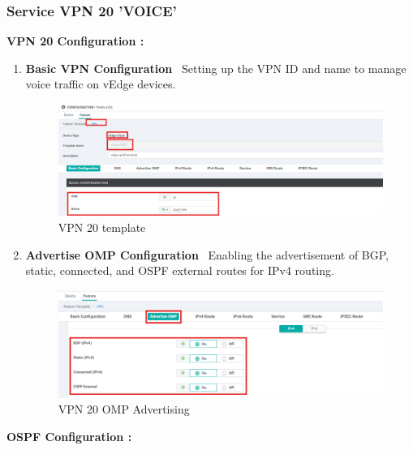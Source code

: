 \documentclass[12pt,english]{report}
\begin{document}
\subsubsection{Service VPN 20 'VOICE'}
\textbf{VPN 20 Configuration :}
\begin{enumerate}
    \item \textbf{Basic VPN Configuration} \
    Setting up the VPN ID and name to manage voice traffic on vEdge devices.
\begin{figure}[H]
    \centering
    \includegraphics[width= 0.9 \textwidth]{chapitre 3/template/13.png}
    \caption{VPN 20 template}
    \label{VPN 20 template}
\end{figure}
    \item \textbf{Advertise OMP Configuration} \
    Enabling the advertisement of BGP, static, connected, and OSPF external routes for IPv4 routing.
\begin{figure}[H]
    \centering
    \includegraphics[width= 0.9 \textwidth]{chapitre 3/template/13.5.png}
    \caption{VPN 20 OMP Advertising}
    \label{VPN 20 OMP Advertising}
\end{figure}
\end{enumerate}
\textbf{OSPF Configuration :}
\end{document}
